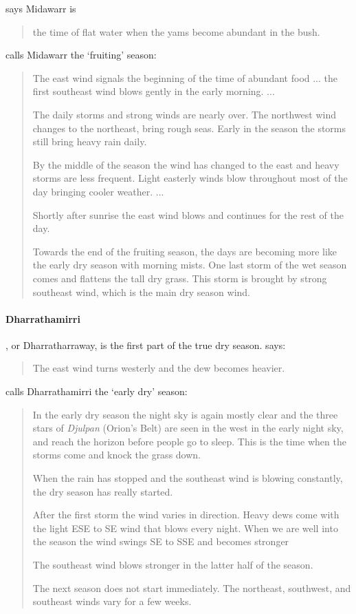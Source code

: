 \citet[][p36]{atlas2014} says Midawarr is \blockquote{
    the time of flat water when the yams become abundant in the bush.
}
\citet{davis1989} calls Midawarr the `fruiting' season:
\blockquote{
    The east wind signals the beginning of the time of abundant food ...
    the first southeast wind blows gently in the early morning. ...

    The daily storms and strong winds are nearly over.
    The northwest wind changes to the northeast, bring rough seas.
    Early in the season the storms still bring heavy rain daily.

    By the middle of the season the wind has changed to the east and heavy storms are less frequent.
    Light easterly winds blow throughout most of the day bringing cooler weather. ...

    Shortly after sunrise the east wind blows and continues for the rest of the day.

    Towards the end of the fruiting season, the days are becoming
    more like the early dry season with morning mists.
    One last storm of the wet season comes and flattens the tall dry grass.
    This storm is brought by strong southeast wind, which is the main dry season wind.
}


\paragraph{Dharrathamirri}, or Dharratharraway, is the first part of the
true dry season.  \citet[][p36]{atlas2014} says: \blockquote{The east wind
turns westerly and the dew becomes heavier.}.

\citet{davis1989} calls Dharrathamirri the `early dry' season:
\blockquote{
    In the early dry season the night sky is again mostly clear and the three stars of
    \textit{Djulpan} (Orion's Belt) are seen in the west in the early night sky,
    and reach the horizon before people go to sleep.
    This is the time when the storms come and knock the grass down.

    When the rain has stopped and the southeast wind is blowing constantly, the dry season has really started.

    After the first storm the wind varies in direction.
    Heavy dews come with the light ESE to SE wind that blows every night.
    When we are well into the season the wind swings SE to SSE and becomes stronger

    The southeast wind blows stronger in the latter half of the season.

    The next season does not start immediately.
    The northeast, southwest, and southeast winds vary for a few weeks.
}


